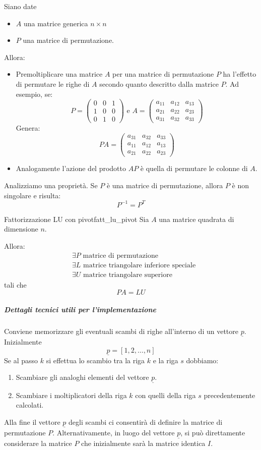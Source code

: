 \documentclass[12pt]{report}
\newcounter{theorem}
\newcommand{\nmu}{}
\begin{document}
\begin{note}{}{}
Siano date
\begin{itemize}
	\item $A$ una matrice generica $n \times n$
	\item $P$ una matrice di permutazione.
\end{itemize}
Allora:
\begin{itemize}
	\item Premoltiplicare una matrice $A$ per una matrice di permutazione $P$ ha l'effetto di permutare le righe di $A$ secondo quanto descritto dalla matrice $P$. Ad esempio, se:
	\[
	P = \begin{pmatrix}
		0 & 0 & 1 \\
		1 & 0 & 0 \\
		0 & 1 & 0
	\end{pmatrix} \text{ e } A = \begin{pmatrix}
		a_{11} & a_{12} & a_{13} \\
		a_{21} & a_{22} & a_{23} \\
		a_{31} & a_{32} & a_{33}
	\end{pmatrix}
	\]
	Genera:
	\[
	PA = \begin{pmatrix}
		a_{31} & a_{32} & a_{33} \\
		a_{11} & a_{12} & a_{13} \\
		a_{21} & a_{22} & a_{23}
	\end{pmatrix}
	\]
	\item Analogamente l'azione del prodotto $AP$ è quella di permutare le colonne di $A$.
\end{itemize}
\end{note}
Analizziamo una proprietà. Se $P$ è una matrice di permutazione, allora $P$ è non singolare e risulta:
\[
P^{-1} = P^T
\]
\begin{theorem}{\nmu Fattorizzazione LU con pivot}{fatt_lu_pivot}
	Sia $A$ una matrice quadrata di dimensione $n$.

	Allora:
	\begin{align*}
		&\exists P \text{ matrice di permutazione} \\
		&\exists L \text{ matrice triangolare inferiore speciale} \\
		&\exists U \text{ matrice triangolare superiore}
	\end{align*}
	tali che
	\[
	PA = LU
	\]
\end{theorem}
\subparagraph{Dettagli tecnici utili per l'implementazione} Conviene memorizzare gli eventuali scambi di righe all'interno di un vettore $\underline{p}$. Inizialmente
\[
\underline{p} = [1, 2, \dots, n]
\]
Se al passo $k$ si effettua lo scambio tra la riga $k$ e la riga $s$ dobbiamo:
\begin{enumerate}
	\item Scambiare gli analoghi elementi del vettore $\underline{p}$.
	\item Scambiare i moltiplicatori della riga $k$ con quelli della riga $s$ precedentemente calcolati.
\end{enumerate}
Alla fine il vettore $\underline{p}$ degli scambi ci consentirà di definire la matrice di permutazione $P$. Alternativamente, in luogo del vettore $\underline{p}$, si può direttamente considerare la matrice $P$ che inizialmente sarà la matrice identica $I$.
\end{document}
